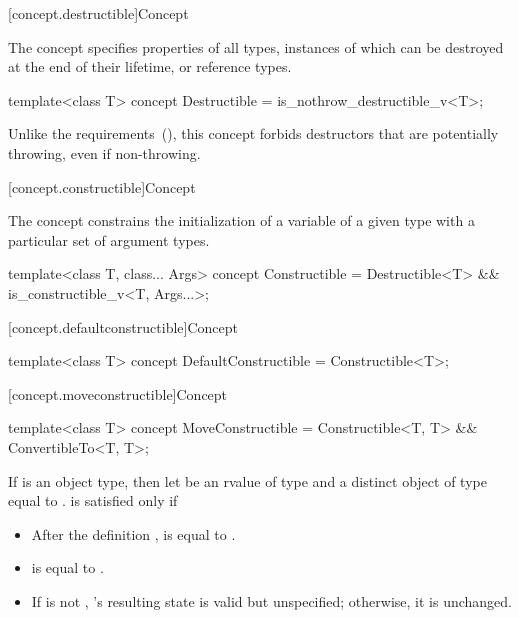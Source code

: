 [concept.destructible]{Concept }

\pnum
The  concept specifies properties of all types,
instances of which can be destroyed at the end of their lifetime, or reference
types.

%
\begin{itemdecl}
template<class T>
  concept Destructible = is_nothrow_destructible_v<T>;
\end{itemdecl}

\begin{itemdescr}
\pnum
\begin{note}
Unlike the  requirements~(), this
concept forbids destructors that are potentially throwing, even if non-throwing.
\end{note}
\end{itemdescr}

[concept.constructible]{Concept }

\pnum
The  concept constrains the initialization of a
variable of a given type with a particular set of argument types.

%
\begin{itemdecl}
template<class T, class... Args>
  concept Constructible = Destructible<T> && is_constructible_v<T, Args...>;
\end{itemdecl}

[concept.defaultconstructible]{Concept }

%
\begin{itemdecl}
template<class T>
  concept DefaultConstructible = Constructible<T>;
\end{itemdecl}

[concept.moveconstructible]{Concept }

%
\begin{itemdecl}
template<class T>
  concept MoveConstructible = Constructible<T, T> && ConvertibleTo<T, T>;
\end{itemdecl}

\begin{itemdescr}
\pnum
If  is an object type, then let  be an rvalue of type
 and  a distinct object of type  equal to
.  is satisfied only if

\begin{itemize}
\item After the definition ,  is equal to .

\item {} is equal to .

\item If  is not , 's resulting state is valid
but unspecified; otherwise, it is unchanged.
\end{itemize}
\end{itemdescr}

